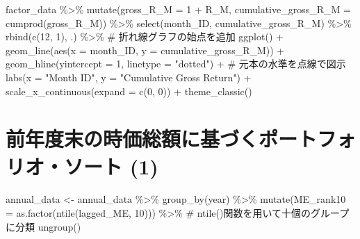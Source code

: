 \documentclass[
  letterpaper,
  DIV=11,
  numbers=noendperiod]{scrreprt}
\newenvironment{Shaded}{\begin{snugshade}}{\end{snugshade}}
\newcommand{\AttributeTok}[1]{\textcolor[rgb]{0.40,0.45,0.13}{#1}}
\newcommand{\CommentTok}[1]{\textcolor[rgb]{0.37,0.37,0.37}{#1}}
\newcommand{\DecValTok}[1]{\textcolor[rgb]{0.68,0.00,0.00}{#1}}
\newcommand{\FunctionTok}[1]{\textcolor[rgb]{0.28,0.35,0.67}{#1}}
\newcommand{\NormalTok}[1]{\textcolor[rgb]{0.00,0.23,0.31}{#1}}
\newcommand{\OtherTok}[1]{\textcolor[rgb]{0.00,0.23,0.31}{#1}}
\newcommand{\SpecialCharTok}[1]{\textcolor[rgb]{0.37,0.37,0.37}{#1}}
\newcommand{\StringTok}[1]{\textcolor[rgb]{0.13,0.47,0.30}{#1}}
\begin{document}
\begin{Shaded}
\begin{Highlighting}[]
\NormalTok{factor\_data }\SpecialCharTok{\%\textgreater{}\%} 
  \FunctionTok{mutate}\NormalTok{(}\AttributeTok{gross\_R\_M =} \DecValTok{1} \SpecialCharTok{+}\NormalTok{ R\_M,}
         \AttributeTok{cumulative\_gross\_R\_M =} \FunctionTok{cumprod}\NormalTok{(gross\_R\_M)) }\SpecialCharTok{\%\textgreater{}\%} 
  \FunctionTok{select}\NormalTok{(month\_ID, cumulative\_gross\_R\_M) }\SpecialCharTok{\%\textgreater{}\%} 
  \FunctionTok{rbind}\NormalTok{(}\FunctionTok{c}\NormalTok{(}\DecValTok{12}\NormalTok{, }\DecValTok{1}\NormalTok{), .) }\SpecialCharTok{\%\textgreater{}\%} \CommentTok{\# 折れ線グラフの始点を追加}
  \FunctionTok{ggplot}\NormalTok{() }\SpecialCharTok{+}
  \FunctionTok{geom\_line}\NormalTok{(}\FunctionTok{aes}\NormalTok{(}\AttributeTok{x =}\NormalTok{ month\_ID, }\AttributeTok{y =}\NormalTok{ cumulative\_gross\_R\_M)) }\SpecialCharTok{+} 
  \FunctionTok{geom\_hline}\NormalTok{(}\AttributeTok{yintercept =} \DecValTok{1}\NormalTok{, }\AttributeTok{linetype =} \StringTok{"dotted"}\NormalTok{) }\SpecialCharTok{+} \CommentTok{\# 元本の水準を点線で図示}
  \FunctionTok{labs}\NormalTok{(}\AttributeTok{x =} \StringTok{"Month ID"}\NormalTok{, }\AttributeTok{y =} \StringTok{"Cumulative Gross Return"}\NormalTok{) }\SpecialCharTok{+}
  \FunctionTok{scale\_x\_continuous}\NormalTok{(}\AttributeTok{expand =} \FunctionTok{c}\NormalTok{(}\DecValTok{0}\NormalTok{, }\DecValTok{0}\NormalTok{)) }\SpecialCharTok{+} 
  \FunctionTok{theme\_classic}\NormalTok{()}
\end{Highlighting}
\end{Shaded}

\section{前年度末の時価総額に基づくポートフォリオ・ソート
(1)}\label{ux524dux5e74ux5ea6ux672bux306eux6642ux4fa1ux7dcfux984dux306bux57faux3065ux304fux30ddux30fcux30c8ux30d5ux30a9ux30eaux30aaux30bdux30fcux30c8-1}

\begin{Shaded}
\begin{Highlighting}[]
\NormalTok{annual\_data }\OtherTok{\textless{}{-}}\NormalTok{ annual\_data }\SpecialCharTok{\%\textgreater{}\%} 
  \FunctionTok{group\_by}\NormalTok{(year) }\SpecialCharTok{\%\textgreater{}\%} 
  \FunctionTok{mutate}\NormalTok{(}\AttributeTok{ME\_rank10 =} \FunctionTok{as.factor}\NormalTok{(}\FunctionTok{ntile}\NormalTok{(lagged\_ME, }\DecValTok{10}\NormalTok{))) }\SpecialCharTok{\%\textgreater{}\%} \CommentTok{\# ntile()関数を用いて十個のグループに分類}
  \FunctionTok{ungroup}\NormalTok{()}
\end{Highlighting}
\end{Shaded}
\end{document}
